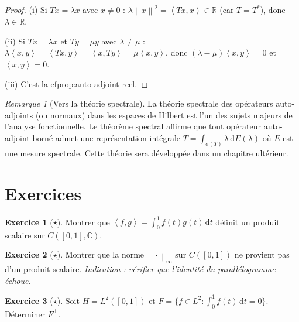 \documentclass[a4paper,12pt]{book}
\newcommand{\R}{\mathbb{R}}
\newcommand{\C}{\mathbb{C}}
\newcommand{\dd}{\mathrm{d}}
\newcommand{\norm}[1]{\left\| #1 \right\|}
\newcommand{\inner}[2]{\left\langle #1, #2 \right\rangle}
\theoremstyle{definition}
\newtheorem{exercice}{Exercice}[chapter]
\theoremstyle{plain}
\theoremstyle{remark}
\newtheorem{remarque}[definition]{Remarque}
\begin{document}
\begin{proof}
(i) Si $Tx = \lambda x$ avec $x \neq 0$ : $\lambda\norm{x}^2 = \inner{Tx}{x} \in \R$ (car $T = T^*$), donc $\lambda \in \R$.

(ii) Si $Tx = \lambda x$ et $Ty = \mu y$ avec $\lambda \neq \mu$ : $\lambda\inner{x}{y} = \inner{Tx}{y} = \inner{x}{Ty} = \mu\inner{x}{y}$, donc $(\lambda - \mu)\inner{x}{y} = 0$ et $\inner{x}{y} = 0$.

(iii) C'est la 
ef{prop:auto-adjoint-reel}.
\end{proof}

\begin{remarque}[Vers la théorie spectrale]\label{rem:vers-spectrale}
La théorie spectrale des opérateurs auto-adjoints (ou normaux) dans les espaces de Hilbert est l'un des sujets majeurs de l'analyse fonctionnelle. Le théorème spectral affirme que tout opérateur auto-adjoint borné admet une représentation intégrale $T = \int_{\sigma(T)} \lambda\,\dd E(\lambda)$ où $E$ est une mesure spectrale. Cette théorie sera développée dans un chapitre ultérieur.
\end{remarque}

\section{Exercices}

\begin{exercice}[$\star$]\label{exo:ch2-verif-ps}
Montrer que $\inner{f}{g} = \int_0^1 f(t)\overline{g(t)} \, \dd t$ définit un produit scalaire sur $C([0,1], \C)$.
\end{exercice}

\begin{exercice}[$\star$]\label{exo:ch2-parallelogramme}
Montrer que la norme $\norm{\cdot}_\infty$ sur $C([0,1])$ ne provient pas d'un produit scalaire. \textit{Indication : vérifier que l'identité du parallélogramme échoue.}
\end{exercice}

\begin{exercice}[$\star$]\label{exo:ch2-orthogonal}
Soit $H = L^2([0,1])$ et $F = \{f \in L^2 : \int_0^1 f(t)\,\dd t = 0\}$. Déterminer $F^\perp$.
\end{exercice}
\end{document}
